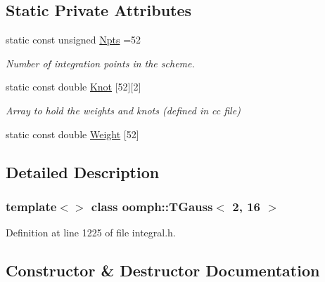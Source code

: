 \subsection*{Static Private Attributes}
\begin{DoxyCompactItemize}
\item 
static const unsigned \hyperlink{classoomph_1_1TGauss_3_012_00_0116_01_4_a46633a677c921b569a7ac650ce2d69dd}{Npts} =52
\begin{DoxyCompactList}\small\item\em Number of integration points in the scheme. \end{DoxyCompactList}\item 
static const double \hyperlink{classoomph_1_1TGauss_3_012_00_0116_01_4_a04e096e7446c033b71d6ec440f93f2c1}{Knot} \mbox{[}52\mbox{]}\mbox{[}2\mbox{]}
\begin{DoxyCompactList}\small\item\em Array to hold the weights and knots (defined in cc file) \end{DoxyCompactList}\item 
static const double \hyperlink{classoomph_1_1TGauss_3_012_00_0116_01_4_ab89539b4866863f4d58b2a88cc262ac4}{Weight} \mbox{[}52\mbox{]}
\end{DoxyCompactItemize}


\subsection{Detailed Description}
\subsubsection*{template$<$$>$\newline
class oomph\+::\+T\+Gauss$<$ 2, 16 $>$}



Definition at line 1225 of file integral.\+h.



\subsection{Constructor \& Destructor Documentation}
\mbox{\label{classoomph_1_1TGauss_3_012_00_0116_01_4_aa6e13683312ac04ceade4416ce76c419}} 
